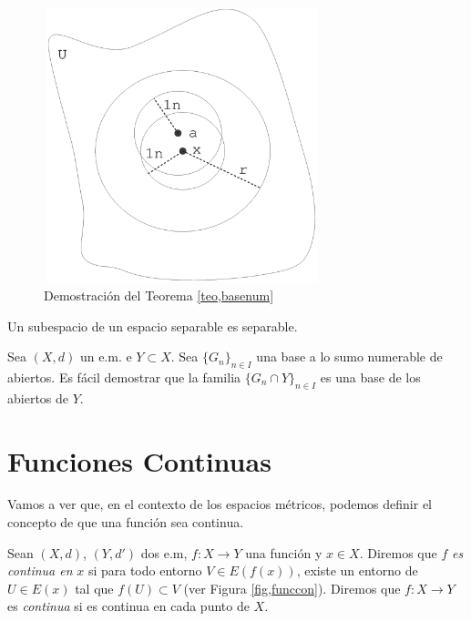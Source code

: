 \begin{figure}
\begin{center}
    \includegraphics[height=8cm, width=8cm]{basenum.eps}
    \caption{Demostraci\'on del Teorema
    \ref{teo,basenum}}\label{fig,basenum}
\end{center}
\end{figure}
\begin{corolario} Un subespacio de un espacio separable es
separable.
\end{corolario}
\begin{demo} Sea $(X,d)$ un e.m. e $Y\subset X$. Sea $\{G_n\}_{n\in I}$
una base a lo sumo numerable de abiertos. Es f\'acil demostrar que
la familia $\{G_n\cap Y\}_{n\in I}$ es una base de los abiertos de
$Y$.
\end{demo}

\section{Funciones Continuas}
Vamos a ver que, en el contexto de los espacios m\'etricos,
podemos definir el concepto de que una funci\'on sea continua.

\begin{definicion} Sean $(X,d)$, $(Y,d')$ dos e.m, $f:X\rightarrow
Y$ una funci\'on y $x\in X$. Diremos que $f$ \emph{es continua en}
$x$ si para todo entorno  $V\in E(f(x))$, existe un entorno de
$U\in E(x)$ tal que $f(U)\subset V$ (ver Figura
\vref{fig,funccon}). Diremos que $f:X\rightarrow Y$ es
\emph{continua} si es continua en cada punto de $X$.
\end{definicion}

